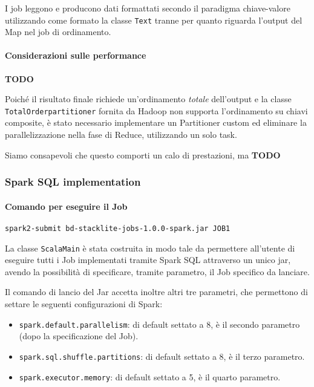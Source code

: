   I job leggono e producono dati formattati secondo il paradigma chiave-valore utilizzando come formato la classe \texttt{Text} tranne per quanto riguarda l'output del Map nel job di ordinamento.

  \paragraph{Considerazioni sulle performance}\label{par:job1:mapreduce:performance}

  \textbf{TODO}

  Poiché il risultato finale richiede un'ordinamento \textit{totale} dell'output e la classe \texttt{TotalOrderpartitioner} fornita da Hadoop non supporta l'ordinamento su chiavi composite,
  è stato necessario implementare un Partitioner custom ed eliminare la parallelizzazione nella fase di Reduce, utilizzando un solo task.

  Siamo consapevoli che questo comporti un calo di prestazioni, ma \textbf{TODO}

  \subsubsection{Spark SQL implementation}\label{subsub:job1:spark}

  \paragraph{Comando per eseguire il Job}\label{par:job1:spark:cmd}

  \texttt{spark2-submit bd-stacklite-jobs-1.0.0-spark.jar JOB1}

  La classe \texttt{ScalaMain} è stata costruita in modo tale da permettere all'utente di eseguire tutti i Job implementati tramite
  Spark SQL attraverso un unico jar, avendo la possibilità di specificare, tramite parametro, il Job specifico da lanciare.

  Il comando di lancio del Jar accetta inoltre altri tre parametri, che permettono di settare le seguenti configurazioni di Spark\@:
  \begin{itemize}
    \item \texttt{spark.default.parallelism}: di default settato a 8, è il secondo parametro (dopo la specificazione del Job).
    \item \texttt{spark.sql.shuffle.partitions}: di default settato a 8, è il terzo parametro.
    \item \texttt{spark.executor.memory}: di default settato a 5, è il quarto parametro.
  \end{itemize}

